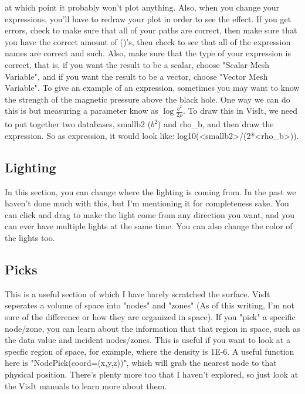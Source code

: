 \documentclass[english]{article}
\begin{document}
    at which point it probably won't plot anything. Also, when you change your expressions, you'll have to 
    redraw your plot in order to see the effect. If you get errors, check to make sure that all of your 
    paths are correct, then make sure that you have the correct amount of ()'s, then check to see that all
    of the expression names are correct and such. Also, make sure that the type of your expression is correct,
    that is, if you want the result to be a scalar, choose "Scalar Mesh Variable", and if you want the result 
    to be a vector, choose "Vector Mesh Variable". To give an example of an expression, sometimes you may want 
    to know the strength of the magnetic pressure above the black hole. One way we can do this is but measuring
    a parameter know as $\log{\frac{b^2}{2\rho}}$. To draw this in VisIt, we need to put together two databases,
    smallb2 ($b^2$) and rho\_b, and then draw the expression. So as expression, it would look like: 
    log10(<smallb2>/(2*<rho\_b>)). 

    \subsection{Lighting}
    In this section, you can change where the lighting is coming from. In the past we haven't done much with 
    this, but I'm mentioning it for completeness sake. You can click and drag to make the light come from any
    direction you want, and you can ever have multiple lights at the same time. You can also change the color
    of the lights too.

    \subsection{Picks}
    This is a useful section of which I have barely scratched the surface. VisIt seperates a volume of space
    into "nodes" and "zones" (As of this writing, I'm not sure of the difference or how they are organized
    in space). If you "pick" a specific node/zone, you can learn about the information that that region
    in space, such as the data value and incident nodes/zones. This is useful if you want to look at a 
    specfic region of space, for example, where the density is 1E-6. A useful function here is 
    "NodePick(coord=(x,y,z))", which will grab the nearest node to that physical position. There's plenty
    more too that I haven't explored, so just look at the VisIt manuals to learn more about them. 
    
\end{document}
